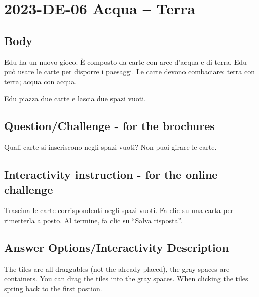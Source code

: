 \documentclass[a4paper,11pt]{report}
\newcommand{\taskGraphicsFolder}{..}
\begin{document}
\section*{\centering{} 2023-DE-06 Acqua – Terra}


\subsection*{Body}

Edu ha un nuovo gioco. È composto da carte con aree d’acqua e di terra.
Edu può usare le carte per disporre i paesaggi. Le carte devono combaciare: terra con terra; acqua con acqua.

{\centering%
\raisebox{-0.5ex}{}
\raisebox{-0.5ex}{}\par}

Edu piazza due carte e lascia due spazi vuoti.

{\em


\subsection*{Question/Challenge - for the brochures}

Quali carte si inseriscono negli spazi vuoti?
Non puoi girare le carte.

{\centering%
\par}

}


\subsection*{Interactivity instruction - for the online challenge}

Trascina le carte corrispondenti negli spazi vuoti. Fa clic su una carta per rimetterla a posto. Al termine, fa clic su \enquote{Salva risposta}.

\begingroup
\renewcommand{\arraystretch}{1.5}
\subsection*{Answer Options/Interactivity Description}

The tiles are all draggables (not the already placed), the gray spaces are containers. You can drag the tiles into the gray spaces. When clicking the tiles spring back to the first postion.
\end{document}
